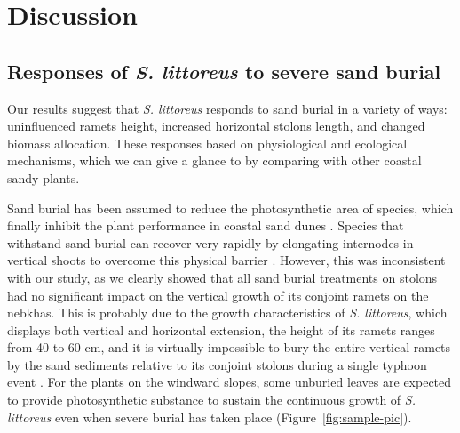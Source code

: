 \documentclass[]{interact}
\theoremstyle{plain}%
\theoremstyle{definition}
\theoremstyle{remark}
\begin{document}
\section{Discussion}

\subsection{Responses of \textit{S. littoreus} to severe sand burial}

Our results suggest that \textit{S. littoreus} responds to sand burial in a variety of ways: uninfluenced ramets height, increased horizontal stolons length, and changed biomass allocation.
These responses based on physiological and ecological mechanisms, which we can give a glance to by comparing with other coastal sandy plants.

Sand burial has been assumed to reduce the photosynthetic area of species, which finally inhibit the plant performance in coastal sand dunes \citep{hespEcologicalProcessesPlant1991, brownMechanismsSurvivingBurial2018}. Species that withstand sand burial can recover very rapidly by elongating internodes in vertical shoots to overcome this physical barrier \citep{frosiniGlobalChangeResponse2012,keijsersModelingBiogeomorphicEvolution2016, quEffectsSandBurial2017,enriquezAssessingBeachDune2019}. However, this was inconsistent with our study, as we clearly showed that all sand burial treatments on stolons had no significant impact on the vertical growth of its conjoint ramets on the nebkhas. This is probably due to the growth characteristics of \textit{S. littoreus}, which displays both vertical and horizontal extension, the height of its ramets ranges from 40 to 60 cm, and it is virtually impossible to bury the entire vertical ramets by the sand sediments relative to its conjoint stolons during a single typhoon event \citep{yangDiurnalvariationcharacteristics2017}. For the plants on the windward slopes, some unburied leaves are expected to provide photosynthetic substance to sustain the continuous growth of \textit{S. littoreus} even when severe burial has taken place (Figure~\ref{fig:sample-pic}). 
\end{document}
